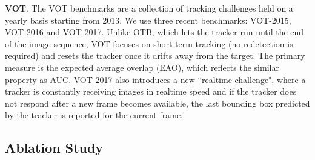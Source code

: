 \documentclass[journal]{IEEEtran}
\begin{document}
\textbf{VOT}. The VOT benchmarks are a collection of tracking challenges held on a yearly basis starting from 2013. We use three recent benchmarks: VOT-2015, VOT-2016 and VOT-2017. Unlike OTB, which lets the tracker run until the end of the image sequence, VOT focuses on short-term tracking (no redetection is required) and resets the tracker once it drifts away from the target. The primary measure is the expected average overlap (EAO), which reflects the similar property as AUC. VOT-2017 also introduces a new ``realtime challenge", where a tracker is constantly receiving images in realtime speed and if the tracker does not respond after a new frame becomes available, the last bounding box predicted by the tracker is reported for the current frame. 

\subsection{Ablation Study}
\end{document}
